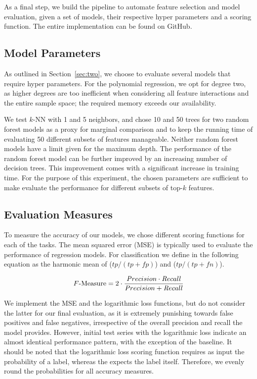 As a final step, we build the pipeline to automate feature selection and model
evaluation, given a set of models, their respective hyper parameters and a
scoring function.  The entire implementation can be found on
GitHub.

\subsection{Model Parameters}

As outlined in Section~\ref{sec:two}, we choose to evaluate several models that
require hyper parameters.  For the polynomial regression, we opt for degree two,
as higher degrees are too inefficient when considering all feature interactions
and the entire sample space; the required memory exceeds our availability.

We test $k$-NN with 1 and 5 neighbors, and chose 10 and 50 trees for two random
forest models as a proxy for marginal comparison and to keep the running time of
evaluating 50 different subsets of features manageable.  Neither random forest
models have a limit given for the maximum depth.  The performance of the random
forest model can be further improved by an increasing number of decision trees.
This improvement comes with a significant increase in training time.  For the
purpose of this experiment, the chosen parameters are sufficient to make
evaluate the performance for different subsets of top-$k$ features.

\subsection{Evaluation Measures}

To measure the accuracy of our models, we chose different scoring functions for
each of the tasks.  The mean squared error (MSE) is typically used to evaluate
the performance of regression models.  For classification we define \fmeasure{}
in the following equation as the harmonic mean of \precision{}
($tp / (tp + fp)$) and \recall{} ($tp / (tp + fn)$).

\vspace{-1em}
\begin{equation}\label{eq:fmeasure}
  \text{\ensuremath{F}-Measure} = 2 \cdot \frac{{\mathop{\mathit Precision}} \cdot {\mathop{\mathit Recall}}} {{\mathop{\mathit Precision}} +
    {\mathop{\mathit Recall}}}
\end{equation}

We implement the MSE and the logarithmic
loss functions, but do not
consider the latter for our final evaluation, as it is extremely punishing
towards false positives and false negatives, irrespective of the overall
precision and recall the model provides.  However, initial test series with the
logarithmic loss indicate an almost identical performance pattern, with the
exception of the baseline.  It should be noted that the logarithmic loss scoring
function requires as input the probability of a label, whereas the \fmeasure{}
expects the label itself.  Therefore, we evenly round the probabilities for all
accuracy measures.

